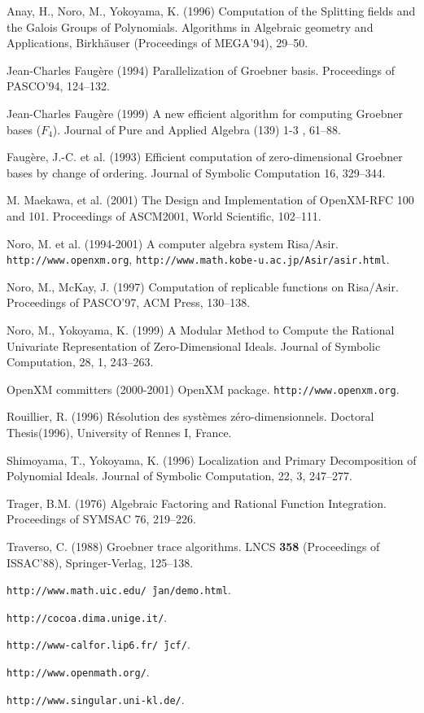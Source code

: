 \documentclass[runningheads]{cl2emult}
\begin{document}
\begin{thebibliography}{7}
%

Anay, H., Noro, M., Yokoyama, K. (1996)
Computation of the Splitting fields and the Galois Groups of Polynomials.
Algorithms in Algebraic geometry and Applications, 
Birkh\"auser (Proceedings of MEGA'94), 29--50.

Jean-Charles Faug\`ere (1994)
Parallelization of Groebner basis.
Proceedings of PASCO'94, 124--132.

Jean-Charles Faug\`ere (1999)
A new efficient algorithm for computing Groebner bases  ($F_4$).
Journal of Pure and Applied Algebra (139) 1-3 , 61--88.

Faug\`ere, J.-C. et al. (1993)
Efficient computation of zero-dimensional Groebner bases by change of ordering.
Journal of Symbolic Computation 16, 329--344.

M. Maekawa, et al. (2001)
The Design and Implementation of OpenXM-RFC 100 and 101.
Proceedings of ASCM2001, World Scientific, 102--111.

Noro, M. et al. (1994-2001)
A computer algebra system Risa/Asir.
{\tt http://www.openxm.org}, {\tt http://www.math.kobe-u.ac.jp/Asir/asir.html}.

Noro, M., McKay, J. (1997)
Computation of replicable functions on Risa/Asir.
Proceedings of PASCO'97, ACM Press, 130--138.

Noro, M., Yokoyama, K. (1999)
A Modular Method to Compute the Rational Univariate
Representation of Zero-Dimensional Ideals.
Journal of Symbolic Computation, 28, 1, 243--263.

OpenXM committers (2000-2001)
OpenXM package.
{\tt http://www.openxm.org}.

Rouillier, R. (1996)
R\'esolution des syst\`emes z\'ero-dimensionnels. 
Doctoral Thesis(1996), University of Rennes I, France.

Shimoyama, T., Yokoyama, K. (1996)
Localization and Primary Decomposition of Polynomial Ideals.
Journal of Symbolic Computation, 22, 3, 247--277.

Trager, B.M. (1976)
Algebraic Factoring and Rational Function Integration.
Proceedings of SYMSAC 76, 219--226.

Traverso, C. (1988)
Groebner trace algorithms.
LNCS {\bf 358} (Proceedings of ISSAC'88), Springer-Verlag, 125--138.

{\tt http://www.math.uic.edu/\~\,jan/demo.html}.

{\tt http://cocoa.dima.unige.it/}.

{\tt http://www-calfor.lip6.fr/\~\,jcf/}.


{\tt http://www.openmath.org/}.

{\tt http://www.singular.uni-kl.de/}.

\end{thebibliography}

\clearpage
{}
\flushbottom
\printindex
\end{document}
